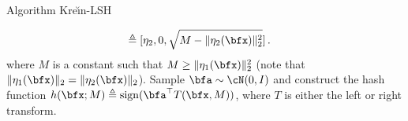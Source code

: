 \documentclass[final]{beamer}
\newcommand{\kr}{Kre\u{\i}n\xspace}
\DeclareMathOperator{\sign}{sign}
\newlength{\onecolwid}
\begin{document}
\begin{frame}[t]
\begin{columns}[t]
\begin{column}{\onecolwid}
\begin{block}{Algorithm \kr-LSH}
\begin{algorithmic}[1]
\begin{align*}
				\triangleq{} &
				[\eta_2,0,\sqrt{M-\|\eta_2(\bfx)\|^2_2}]\,.
				\end{align*}
				where $ M $ is a constant such that $ M\ge \|\eta_1(\bfx)\|_2^2 
				$ (note 
				that $ 
				\|\eta_1(\bfx)\|_2 = \|\eta_2(\bfx)\|_2 $).
				\State Sample $\bfa\sim \cN(0,I)$ and construct the hash 
				function 
				$ h(\bfx; M)\triangleq \sign(\bfa^\top T(\bfx, M))$,
				where $T$ is either the left or right 
				transform.\label{ln:simple-lsh}
			\end{algorithmic}
        \end{block}
\end{column}
 
		
	\end{columns} %
	
\end{frame} %
\end{document}
